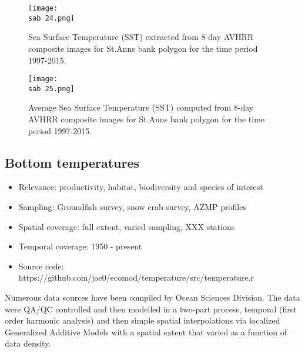 \documentclass[letterpaper,portrait,11pt]{scrartcl}
\numberwithin{equation}{section}		%
\numberwithin{figure}{section}		%
\numberwithin{table}{section}				%
\newcommand{\ecomod}{\string~/ecomod_data/}   %
\newcommand{\sab}{\ecomod/mpa/sab/}   %
\begin{document}
\begin{figure}[h]
  \label{fig:SSTfromAVHRRts}
  \centering
  \texttt{[image: \\sab 24.png]}
  \caption{Sea Surface Temperature (SST) extracted from 8-day AVHRR composite images for St.Anns bank polygon for the time period 1997-2015.}
\end{figure}

\begin{figure}[h]
  \label{fig:SstSeasonal}
  \centering
  \texttt{[image: \\sab 25.png]}
  \caption{Average Sea Surface Temperature (SST) computed from 8-day AVHRR composite images for St.Anns bank polygon for the time period 1997-2015.}
\end{figure}

\clearpage


\subsection{Bottom temperatures}

\begin{itemize}
  \item Relevance:  productivity, habitat, biodiversity and species of interest
  \item Sampling:  Groundfish survey, snow crab survey, AZMP profiles 
  \item Spatial coverage: full extent, varied sampling, XXX stations
  \item Temporal coverage: 1950 - present
  \item Source code: https://github.com/jae0/ecomod/temperature/src/temperature.r
\end{itemize}

Numerous data sources have been compiled by Ocean Sciences Division. The data were QA/QC controlled and then modelled in a two-part process, temporal (first order harmonic analysis) and then simple spatial interpolations via localized Generalized Additive Models with a spatial extent that varied as a function of data density. 

\clearpage
\end{document}
